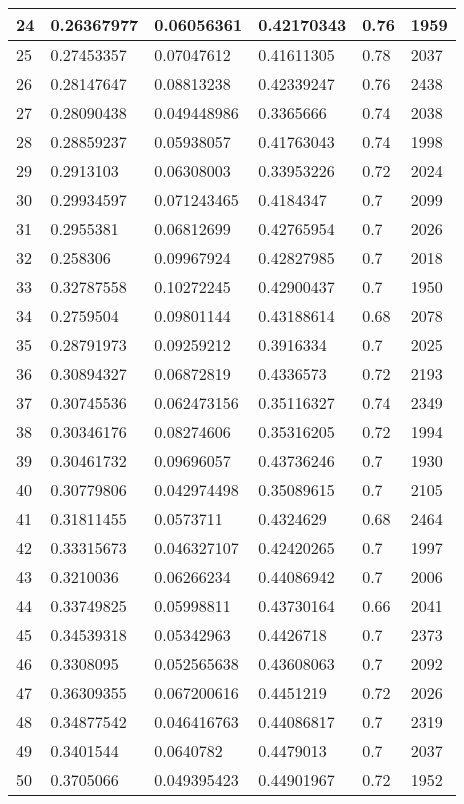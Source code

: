 \begin{longtable}{|l|l|l|l|l|l|}
24 & 0.26367977 & 0.06056361 & 0.42170343 & 0.76 & 1959 \\ \hline 
25 & 0.27453357 & 0.07047612 & 0.41611305 & 0.78 & 2037 \\ \hline 
26 & 0.28147647 & 0.08813238 & 0.42339247 & 0.76 & 2438 \\ \hline 
27 & 0.28090438 & 0.049448986 & 0.3365666 & 0.74 & 2038 \\ \hline 
28 & 0.28859237 & 0.05938057 & 0.41763043 & 0.74 & 1998 \\ \hline 
29 & 0.2913103 & 0.06308003 & 0.33953226 & 0.72 & 2024 \\ \hline 
30 & 0.29934597 & 0.071243465 & 0.4184347 & 0.7 & 2099 \\ \hline 
31 & 0.2955381 & 0.06812699 & 0.42765954 & 0.7 & 2026 \\ \hline 
32 & 0.258306 & 0.09967924 & 0.42827985 & 0.7 & 2018 \\ \hline 
33 & 0.32787558 & 0.10272245 & 0.42900437 & 0.7 & 1950 \\ \hline 
34 & 0.2759504 & 0.09801144 & 0.43188614 & 0.68 & 2078 \\ \hline 
35 & 0.28791973 & 0.09259212 & 0.3916334 & 0.7 & 2025 \\ \hline 
36 & 0.30894327 & 0.06872819 & 0.4336573 & 0.72 & 2193 \\ \hline 
37 & 0.30745536 & 0.062473156 & 0.35116327 & 0.74 & 2349 \\ \hline 
38 & 0.30346176 & 0.08274606 & 0.35316205 & 0.72 & 1994 \\ \hline 
39 & 0.30461732 & 0.09696057 & 0.43736246 & 0.7 & 1930 \\ \hline 
40 & 0.30779806 & 0.042974498 & 0.35089615 & 0.7 & 2105 \\ \hline 
41 & 0.31811455 & 0.0573711 & 0.4324629 & 0.68 & 2464 \\ \hline 
42 & 0.33315673 & 0.046327107 & 0.42420265 & 0.7 & 1997 \\ \hline 
43 & 0.3210036 & 0.06266234 & 0.44086942 & 0.7 & 2006 \\ \hline 
44 & 0.33749825 & 0.05998811 & 0.43730164 & 0.66 & 2041 \\ \hline 
45 & 0.34539318 & 0.05342963 & 0.4426718 & 0.7 & 2373 \\ \hline 
46 & 0.3308095 & 0.052565638 & 0.43608063 & 0.7 & 2092 \\ \hline 
47 & 0.36309355 & 0.067200616 & 0.4451219 & 0.72 & 2026 \\ \hline 
48 & 0.34877542 & 0.046416763 & 0.44086817 & 0.7 & 2319 \\ \hline 
49 & 0.3401544 & 0.0640782 & 0.4479013 & 0.7 & 2037 \\ \hline 
50 & 0.3705066 & 0.049395423 & 0.44901967 & 0.72 & 1952 \\ \hline 
\end{longtable}